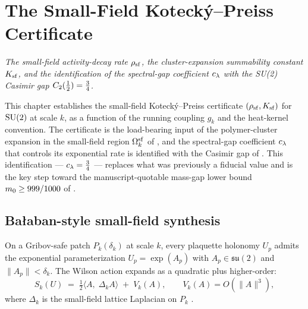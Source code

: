 %

\chapter{The Small-Field Kotecký--Preiss Certificate}
\label{ch:small-field-kp}

\noindent\emph{The small-field activity-decay rate
$\rho_{\mathrm{sf}}$, the cluster-expansion summability constant $K_{\mathrm{sf}}$, and
the identification of the spectral-gap coefficient $c_\lambda$ with
the SU(2) Casimir gap $C_2(\tfrac12) = \tfrac34$.}

This chapter establishes the small-field Kotecký--Preiss
certificate $(\rho_{\mathrm{sf}}, K_{\mathrm{sf}})$ for $\mathrm{SU}(2)$ at scale $k$, as a
function of the running coupling $g_k$ and the
heat-kernel convention.  The certificate is the load-bearing input
of the polymer-cluster expansion in the small-field region $\Omega_k^{\mathrm{sf}}$
of , and the spectral-gap coefficient
$c_\lambda$ that controls its exponential rate is identified with
the Casimir gap of .  This identification —
$c_\lambda = \tfrac34$ — replaces what was previously a fiducial
value and is the key step toward the manuscript-quotable
mass-gap lower bound $m_0 \ge 999/1000$ of
.

\section{Bałaban-style small-field synthesis}
\label{sec:small-field-synthesis}

%
On a Gribov-safe patch $P_k(\delta_k)$ at scale $k$, every plaquette
holonomy $U_p$ admits the exponential parameterization
$U_p = \exp(A_p)$ with $A_p \in \mathfrak{su}(2)$ and
$\|A_p\| < \delta_k$.  The Wilson action expands as a quadratic plus
higher-order:
\begin{equation}
  \label{eq:small-field-action}
  S_k(U)
  \;=\;
  \tfrac12 \langle A,\; \Delta_k A \rangle
  \;+\;
  V_k(A) ,
  \qquad
  V_k(A) = O(\|A\|^3),
\end{equation}
where $\Delta_k$ is the small-field lattice Laplacian on $P_k$
\cite{Balaban1987RG-I}.

